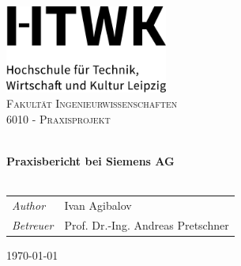 \begin{titlepage}
    \vbox{}
    \vbox{}
    \begin{center}
        \includegraphics[width=0.40\textwidth,center]{Images/HTWK_Zusatz_de_V_Black.jpg}\\[1cm]
        \textsc{\LARGE Fakultät Ingenieurwissenschaften}\\[1.5cm]
        \textsc{\Large 6010 - Praxisprojekt}\\[0.5cm]
        \vbox{ }

        \HRule \\[0.4cm]
        { \huge \bfseries Praxisbericht bei Siemens AG}\\[0.4cm]
        \HRule \\[1.5cm]

        \begin{table}[h]
            \large
                \centering
                \begin{tabular}{ll}
                    \emph{Author} & Ivan Agibalov \\
                    \emph{Betreuer} & Prof. Dr.-Ing. Andreas Pretschner  
                \end{tabular}
            \end{table}
            \vfill
            {\large \today}
    \end{center}
\end{titlepage}